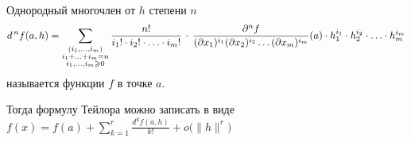 \begin{opr}\label{опр:дифференциал}
	Однородный многочлен от $h$ степени $n$ 
	\[d^{\,n} f(a, h) = \sum_{\substack{(i_1, \ldots, i_m) \\ i_1 + \ldots + i_m = n \\ i_1, \ldots, i_m \geqslant 0}} \frac{n!}{i_1! \cdot i_2! \cdot \ldots \cdot i_m!}\, \cdot \, \frac{\partial^nf}{(\partial x_1)^{i_1} (\partial x_2)^{i_2} \ldots (\partial x_m)^{i_m}} (a) \cdot h_1^{i_1} \cdot h_2^{i_2} \cdot \ldots \cdot h_m^{i_m}\]
	называется
	функции $f$ в точке $a$.
\end{opr} %
 
Тогда формулу Тейлора можно записать в виде $\displaystyle f(x) = f(a) + \sum_{k = 1}^r \frac{d^kf(a, h)}{k!} + o\bigl(\|h\|^r\bigl)$
